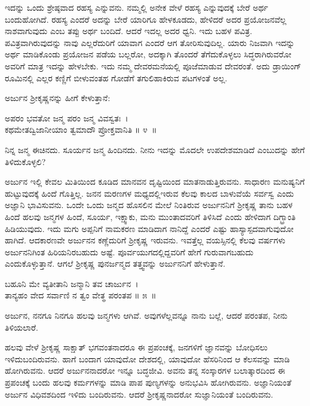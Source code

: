 ಇದನ್ನು ಒಂದು ಶ್ರೇಷ್ಠವಾದ ರಹಸ್ಯ ಎನ್ನುವನು. ನಮ್ಮಲ್ಲಿ ಅನೇಕ ವೇಳೆ ರಹಸ್ಯ ಎನ್ನುವುದಕ್ಕೆ ಬೇರೆ ಅರ್ಥ ಬಂದುಹೋಗಿದೆ. ರಹಸ್ಯ ಎಂದರೆ ಅದನ್ನು ಬೇರೆ ಯಾರಿಗೂ ಹೇಳಕೂಡದು, ಹೇಳಿದರೆ ಅದರ ಪ್ರಯೋಜನವೆಲ್ಲ ನಾಶವಾಗುವುದು ಎಂಬ ತಪ್ಪು ಅರ್ಥ ಬಂದಿದೆ. ಆದರೆ ಇದಲ್ಲ ಅದರ ಧ್ವನಿ. ಇದು ಬಹಳ ಪವಿತ್ರ. ಪವಿತ್ರವಾಗಿರುವುದನ್ನು ನಾವು ಎಲ್ಲರೆದುರಿಗೆ ಯಾವಾಗ ಎಂದರೆ ಆಗ ತೋರಿಸುವುದಿಲ್ಲ. ಯಾರು ನಿಜವಾಗಿ ಇದನ್ನು ಅರ್ಥ ಮಾಡಿಕೊಂಡು ಪ್ರಯೋಜನ ಪಡೆಯ ಬಲ್ಲರೋ, ಅದಕ್ಕಾಗಿ ತೊಂದರೆ ತೆಗೆದುಕೊಳ್ಳಲು ಸಿದ್ಧರಾಗಿರುವರೋ ಅವರಿಗೆ ಮಾತ್ರ ಇದನ್ನು ಹೇಳಬೇಕು. ಇದು ನಮ್ಮ ದೇವರಮನೆಯಲ್ಲಿ ಪೂಜೆಮಾಡುವ ದೇವರಂತೆ. ಅದು ಡ್ರಾಯಿಂಗ್ ರೂಮಿನಲ್ಲಿ ಎಲ್ಲರ ಕಣ್ಣಿಗೆ ಬೀಳುವಂತಹ ಗೋಡೆಗೆ ತಗುಲಿಹಾಕಿರುವ ಪಟಗಳಂತೆ ಅಲ್ಲ.

ಅರ್ಜುನ ಶ‍್ರೀಕೃಷ್ಣನನ್ನು ಹೀಗೆ ಕೇಳುತ್ತಾನೆ:

\begin{shloka}
ಅಪರಂ ಭವತೋ ಜನ್ಮ ಪರಂ ಜನ್ಮ ವಿವಸ್ವತಃ~।\\ಕಥಮೇತದ್ವಿಜಾನೀಯಾಂ ತ್ವಮಾದೌ ಪ್ರೋಕ್ತವಾನಿತಿ \hfill॥ ೪~॥
\end{shloka}

\begin{artha}
ನಿನ್ನ ಜನ್ಮ ಈಚಿನದು. ಸೂರ್ಯನ ಜನ್ಮ ಹಿಂದಿನದು. ನೀನು ಇದನ್ನು ಮೊದಲೇ ಉಪದೇಶಮಾಡಿದೆ ಎಂಬುದನ್ನು ಹೇಗೆ ತಿಳಿದುಕೊಳ್ಳಲಿ?
\end{artha}

ಅರ್ಜುನ ಇಲ್ಲಿ ಕೇವಲ ಮಿತಿಯಿಂದ ಕೂಡಿದ ಮಾನವನ ದೃಷ್ಟಿಯಿಂದ ಮಾತನಾಡುತ್ತಿರು\-ವನು. ಸಾಧಾರಣ ಮನುಷ್ಯನಿಗೆ ಹುಟ್ಟುವುದಕ್ಕೆ ಹಿಂದೆ ಗೊತ್ತಿಲ್ಲ. ಜನನ ಮರಣಗಳ ಮಧ್ಯದಲ್ಲಿ\break ಇರುವ ಕೆಲವು ಕಾಲದ ಬಾಳುವೆಯೆ ಸರ್ವಸ್ವ ಎಂದು ಅಜ್ಞಾನಿ ಭಾವಿಸುವನು. ಒಂದೇ ಒಂದು ಜನ್ಮದ ಹೊಸಲಿನ ಮೇಲೆ ನಿಂತಿರುವ ಅರ್ಜುನನಿಗೆ ಶ‍್ರೀಕೃಷ್ಣ ತಾನು ಬಹಳ ಹಿಂದೆ ಹಲವು ಜನ್ಮಗಳ ಹಿಂದೆ, ಸೂರ್ಯ, ಇಕ್ಷ್ವಾಕು, ಮನು ಮುಂತಾದವರಿಗೆ ತಿಳಿಸಿದೆ ಎಂದು ಹೇಳಿದಾಗ ದಿಗ್ಭ್ರಾಂತಿ ಹಿಡಿಯುವುದು. ಇದು ಮಗು ಅಪ್ಪನಿಗೆ ನಾಮಕರಣ ಮಾಡಿದಾಗ ನಾನಿದ್ದೆ ಎಂದರೆ ಎಷ್ಟು ಹಾಸ್ಯಾಸ್ಪದವಾಗುವುದೋ ಹಾಗಿದೆ. ಆದಕಾರಣವೇ ಅರ್ಜುನನ ಕಣ್ಣೆದುರಿಗೆ ಶ‍್ರೀಕೃಷ್ಣ ಇರುವನು. ಇವತ್ತೆಲ್ಲ ವಯಸ್ಸಿನಲ್ಲಿ ಕೆಲವು ವರ್ಷಗಳು ಅರ್ಜುನನಿಗಿಂತ ಹಿರಿಯನಿರಬಹುದು ಅಷ್ಟೆ. ಪೂರ್ವಯುಗದಲ್ಲಿದ್ದವರಿಗೆ ಹೇಗೆ ಗುರುವಾಗಬಹುದು ಎಂದುಕೊಳ್ಳುತ್ತಾನೆ. ಆಗಲೆ ಶ‍್ರೀಕೃಷ್ಣ ಪುನರ್ಜನ್ಮದ ತತ್ತ್ವವನ್ನು ಅರ್ಜುನನಿಗೆ ಹೇಳುತ್ತಾನೆ.

\begin{shloka}
ಬಹೂನಿ ಮೇ ವ್ಯತೀತಾನಿ ಜನ್ಮಾನಿ ತವ ಚಾರ್ಜುನ~।\\ತಾನ್ಯಹಂ ವೇದ ಸರ್ವಾಣಿ ನ ತ್ವಂ ವೇತ್ಥ ಪರಂತಪ \hfill॥ ೫~॥
\end{shloka}

\begin{artha}
ಅರ್ಜುನ, ನನಗೂ ನಿನಗೂ ಹಲವು ಜನ್ಮಗಳು ಆಗಿವೆ. ಅವುಗಳೆಲ್ಲವನ್ನೂ ನಾನು ಬಲ್ಲೆ, ಆದರೆ ಪರಂತಪ, ನೀನು ತಿಳಿಯಲಾರೆ.
\end{artha}

ಹಲವು ವೇಳೆ ಶ‍್ರೀಕೃಷ್ಣ ಸಾಕ್ಷಾತ್ ಭಗವಂತನಾದರೂ ಈ ಪ್ರಪಂಚಕ್ಕೆ, ಜನಗಳಿಗೆ ಜ್ಞಾನವನ್ನು ಬೋಧಿಸಲು ಇಳಿದುಬಂದಿರುವನು. ಹಾಗೆ ಬಂದಾಗ ಯಾವುದೋ ದೇಶದಲ್ಲಿ, ಯಾವುದೋ ಹೆಸರಿನಿಂದ ಆ ಕೆಲಸವನ್ನು ಮಾಡಿ ಹೋಗಿರುವನು. ಆದರೆ ಅರ್ಜುನನಾದರೋ ಇನ್ನೂ ಬದ್ಧಜೀವಿ. ಅವನು ತನ್ನ ಸಂಸ್ಕಾರಗಳ ಬಲಾತ್ಕಾರದಿಂದ ಈ ಪ್ರಪಂಚಕ್ಕೆ ಬಂದು ಹಲವು ಕರ್ಮಗಳನ್ನು ಮಾಡಿ ಪಾಪ ಪುಣ್ಯಗಳನ್ನು ಅನುಭವಿಸಿ ಹೋಗಿರುವನು. ಅಜ್ಞಾನಿಯಂತೆ ಅರ್ಜುನ ವಿಧಿವಶದಿಂದ ಇಳಿದು ಬಂದಿರುವನು. ಆದರೆ ಶ‍್ರೀಕೃಷ್ಣನಾದರೋ ಸುಜ್ಞಾನಿಯಂತೆ ಬಂದಿರುವನು.

